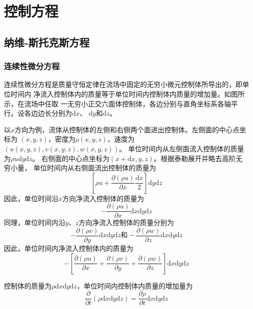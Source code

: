 \chapter{控制方程}
\section{纳维-斯托克斯方程}
\subsection{连续性微分方程}
连续性微分方程是质量守恒定律在流场中固定的无穷小微元控制体所导出的，即单位时间内
净流入控制体内的质量等于单位时间内控制体内质量的增加量。如图所示，在流场中任取
一无穷小正交六面体控制体，各边分别与直角坐标系各轴平行。设各边边长分别为$\mathrm{d}x$、
$\mathrm{d}y$和$\mathrm{d}z$。

以$x$方向为例，流体从控制体的左侧和右侧两个面进出控制体。左侧面的中心点坐标为
$(x,y,z)$，密度为$\rho(x,y,z)$，速度为$(u(x,y,z), v(x,y,z), w(x,y,z))$。
单位时间内从左侧面流入控制体的质量为$\rho u\mathrm{d}y\mathrm{d}z$。
右侧面的中心点坐标为$(x+\mathrm{d}x,y,z)$。根据泰勒展开并略去高阶无穷小量，
单位时间内从右侧面流出控制体的质量为
\begin{equation*}
  \left[\rho u+\frac{\partial (\rho u)}{\partial x}\frac {\mathrm{d}x}{2}\right]\mathrm{d}y\mathrm{d}z
\end{equation*}
因此，单位时间沿$x$方向净流入控制体的质量为
\begin{equation}
  -\frac{\partial (\rho u)}{\partial x}\mathrm{d}x\mathrm{d}y\mathrm{d}z
\end{equation}
同理，单位时间内沿$y$、$z$方向净流入控制体的质量分别为
\begin{equation*}
  -\frac{\partial (\rho v)}{\partial y}\mathrm{d}x\mathrm{d}y\mathrm{d}z
  \mbox{和}
  -\frac{\partial (\rho w)}{\partial z}\mathrm{d}x\mathrm{d}y\mathrm{d}z
\end{equation*}
因此，单位时间内净流入控制体内的质量为
\begin{equation}
  -
  \left[
    \frac {\partial (\rho u)} {\partial x}
    +
    \frac {\partial (\rho v)} {\partial y}
    +
    \frac {\partial (\rho w)} {\partial z}
  \right]
  \mathrm{d}x\mathrm{d}y\mathrm{d}z
\end{equation}

控制体的质量为$\rho\mathrm{d}x\mathrm{d}y\mathrm{d}z$，单位时间内控制体内质量的增加量为
\begin{equation}
  \frac{\partial}{\partial t}(\rho\mathrm{d}x\mathrm{d}y\mathrm{d}z) =
  \frac{\partial \rho}{\partial  t}\mathrm{d}x\mathrm{d}y\mathrm{d}z
\end{equation}

